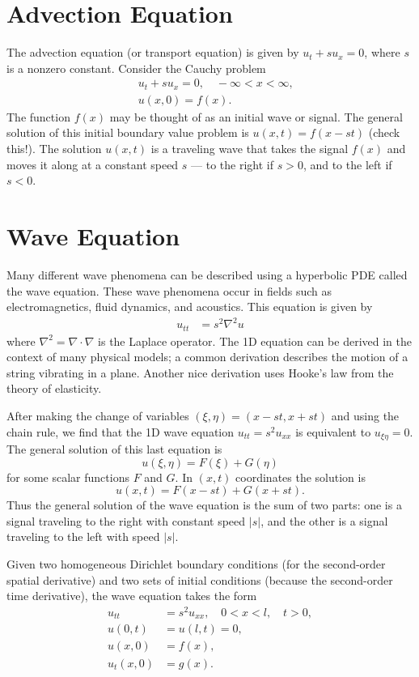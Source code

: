 \label{lab:waveeqn}

\section*{Advection Equation}
The advection equation (or transport equation) is given by $u_t + s u_x = 0$, where $s$ is a nonzero constant.
Consider the Cauchy problem
\begin{align*}
	& u_t + su_x = 0, \quad -\infty < x < \infty,\\\
	& u(x,0) = f(x).
\end{align*}
The function $f(x)$ may be thought of as an initial wave or signal.
The general solution of this initial boundary value problem is $u(x,t) = f(x-st)$ (check this!).
The solution $u(x,t)$ is a traveling wave that takes the signal $f(x)$ and moves it along at a constant speed $s$ --- to the right if $s > 0$, and to the left if $s < 0$.

\section*{Wave Equation}
Many different wave phenomena can be described using a hyperbolic PDE called the wave equation.
These wave phenomena occur in fields such as electromagnetics, fluid dynamics, and acoustics.
This equation is given by
\begin{align}
	u_{tt} &= s^2 \nabla^2 u
\end{align}
where $\nabla^2 = \nabla \cdot \nabla$ is the Laplace operator.
The 1D equation can be derived in the context of many physical models; a common derivation describes the motion of a string vibrating in a plane.
Another nice derivation uses Hooke's law from the theory of elasticity.

After making the change of variables $(\xi,\eta) = (x-st, x + st)$ and using the chain rule, we find that the 1D wave equation $u_{tt} = s^2 u_{xx}$ is equivalent to $u_{\xi \eta} = 0$.
The general solution of this last equation is
\[u(\xi, \eta) = F(\xi) + G(\eta)\]
for some scalar functions $F$ and $G$.
In $(x,t)$ coordinates the solution is
\[u(x,t) = F(x-st) + G(x+st).\]
Thus the general solution of the wave equation is the sum of two parts: one is a signal traveling to the right with constant speed $|s|$, and the other is a signal traveling to the left with speed $|s|$.


Given two homogeneous Dirichlet boundary conditions (for the second-order spatial derivative) and two sets of initial conditions (because the second-order time derivative), the wave equation takes the form
\begin{equation}
    \begin{split}
	u_{tt} &= s^2 u_{xx}, \quad 0 < x < l, \quad t > 0,\\
	u(0,t) &= u(l,t) = 0, \\
	u(x,0) &= f(x),\\
	u_t(x,0) &= g(x).
    \label{waveeqn:eqn:wave-equation}
    \end{split}
\end{equation}

